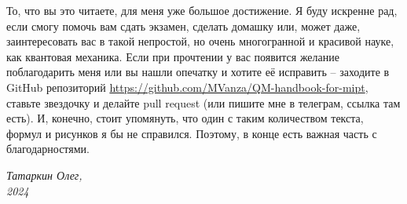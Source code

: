 То, что вы это читаете, для меня уже большое достижение. Я буду искренне рад, если смогу помочь вам сдать экзамен, сделать домашку или, может даже, заинтересовать вас в такой непростой, но очень многогранной и красивой науке, как квантовая механика. Если при прочтении у вас появится желание поблагодарить меня или вы нашли опечатку и хотите её исправить -- заходите в GitHub репозиторий \url{https://github.com/MVanza/QM-handbook-for-mipt}, ставьте звездочку и делайте pull request (или пишите мне в телеграм, ссылка там есть). И, конечно, стоит упомянуть, что один с таким количеством текста, формул и рисунков я бы не справился. Поэтому, в конце есть важная часть с благодарностями.
\\
\begin{flushright}
    \textit{Татаркин Олег,}\\
    \textit{2024}
\end{flushright}
